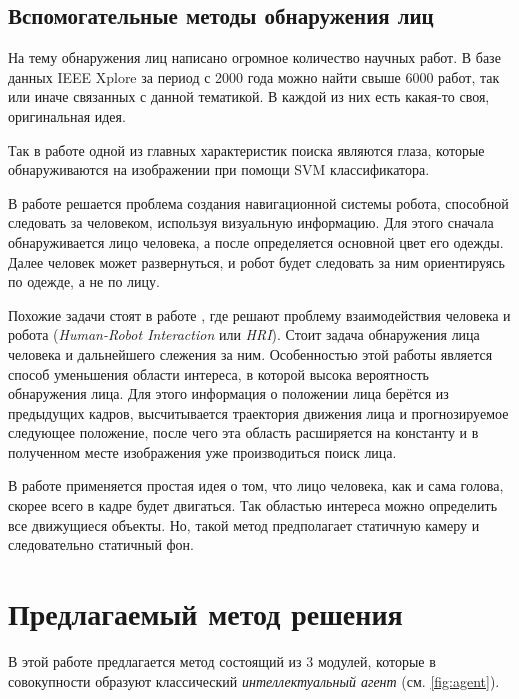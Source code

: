 \documentclass[12pt]{report}
\begin{document}
\section{Вспомогательные методы обнаружения лиц}

На тему обнаружения лиц написано огромное количество научных работ. В базе данных IEEE Xplore за период с 2000 года 
можно найти свыше 6000 работ, так или иначе связанных с данной тематикой. В каждой из них есть какая-то своя, 
оригинальная идея.

Так в работе \citep{jee2004eye} одной из главных характеристик поиска являются глаза, которые обнаруживаются на 
изображении при помощи SVM классификатора.

В работе \citep{capi2010vision} решается проблема создания навигационной системы робота, способной следовать за 
человеком, используя визуальную информацию. Для этого сначала обнаруживается лицо человека, а после определяется 
основной цвет его одежды. Далее человек может развернуться, и робот будет следовать за ним ориентируясь по одежде, а 
не по лицу.

Похожие задачи стоят в работе \citep{luo2007face}, где решают проблему взаимодействия человека и робота (\textit
{Human-Robot Interaction} или \textit{HRI}). Стоит задача обнаружения лица человека и дальнейшего слежения за ним. 
Особенностью этой работы является способ уменьшения области интереса, в которой высока вероятность обнаружения лица. 
Для этого информация о положении лица берётся из предыдущих кадров, высчитывается траектория движения лица и 
прогнозируемое следующее положение, после чего эта область расширяется на константу и в полученном месте изображения 
уже производиться поиск лица.

В работе \citep{zhang2010fast} применяется простая идея о том, что лицо человека, как и сама голова, скорее всего в 
кадре будет двигаться. Так областью интереса можно определить все движущиеся объекты. Но, такой метод предполагает 
статичную камеру и следовательно статичный фон.


\chapter{Предлагаемый метод решения}
\thispagestyle{fancy}

В этой работе предлагается метод состоящий из 3 модулей, которые в совокупности образуют классический \emph
{интеллектуальный агент} (см. \ref{fig:agent}). 
\end{document}
